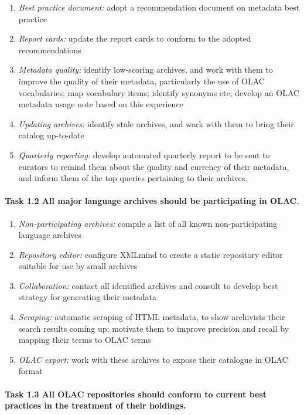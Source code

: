 \begin{enumerate}[label=\textit{\task\alph*}]
\item \textit{Best practice document:}
  adopt a recommendation document on metadata best practice
\item \textit{Report cards:}
  update the report cards to conform to the adopted recommendations
\item \textit{Metadata quality:}
  identify low-scoring archives, and work with them to
  improve the quality of their metadata, particularly the
  use of OLAC vocabularies; map vocabulary items; identify synonyms etc;
  develop an OLAC metadata usage note based on this experience
\item \textit{Updating archives:}
  identify stale archives, and work with them to bring their 
  catalog up-to-date
\item \textit{Quarterly reporting:}
  develop automated quarterly report to be sent to curators to 
  remind them about the quality and currency of their metadata, and 
  inform them of the top queries pertaining to their archives.
\end{enumerate}

\def\task{1.2}
\paragraph{Task {\task} All major language archives should be participating in OLAC.}

\begin{enumerate}[label=\textit{\task\alph*}]
\item \textit{Non-participating archives:}
  compile a list of all known non-participating language archives
\item \textit{Repository editor:}
  configure XMLmind to create a static repository editor suitable
  for use by small archives
\item \textit{Collaboration:}
  contact all identified archives and consult to develop best
  strategy for generating their metadata
\item \textit{Scraping:}
  automatic scraping of HTML metadata, to show archivists
  their search results coming up; motivate them to improve precision
  and recall by mapping their terms to OLAC terms
\item \textit{OLAC export:}
  work with these archives to expose their catalogue in OLAC format
\end{enumerate}

\def\task{1.3}
\paragraph{Task {\task} All OLAC repositories should conform to current best practices
      in the treatment of their holdings.}

